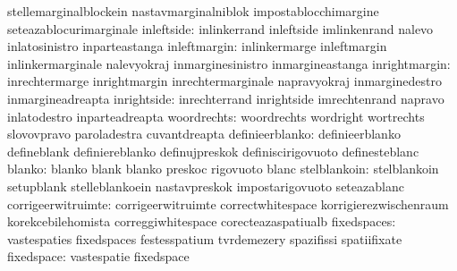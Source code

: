                                   stellemarginalblockein           nastavmarginalniblok
                                  impostablocchimargine            seteazablocurimarginale
                      inleftside: inlinkerrand                     inleftside
                                  imlinkenrand                     nalevo
                                  inlatosinistro                   inparteastanga
                    inleftmargin: inlinkermarge                    inleftmargin
                                  inlinkermarginale                nalevyokraj
                                  inmarginesinistro                inmargineastanga
                   inrightmargin: inrechtermarge                   inrightmargin
                                  inrechtermarginale               napravyokraj
                                  inmarginedestro                  inmargineadreapta
                     inrightside: inrechterrand                    inrightside
                                  imrechtenrand                    napravo
                                  inlatodestro                     inparteadreapta
                     woordrechts: woordrechts                      wordright
                                  wortrechts                       slovovpravo
                                  paroladestra                     cuvantdreapta
                 definieerblanko: definieerblanko                  defineblank
                                  definiereblanko                  definujpreskok
                                  definiscirigovuoto               definesteblanc
                          blanko: blanko                           blank
                                  blanko                           preskoc
                                  rigovuoto                        blanc
                    stelblankoin: stelblankoin                     setupblank
                                  stelleblankoein                  nastavpreskok
                                  impostarigovuoto                 seteazablanc
              corrigeerwitruimte: corrigeerwitruimte               correctwhitespace
                                  korrigierezwischenraum           korekcebilehomista
                                  correggiwhitespace               corecteazaspatiualb
                     fixedspaces: vastespaties                     fixedspaces
                                  festesspatium                    tvrdemezery
                                  spazifissi                       spatiifixate
                      fixedspace: vastespatie                      fixedspace

